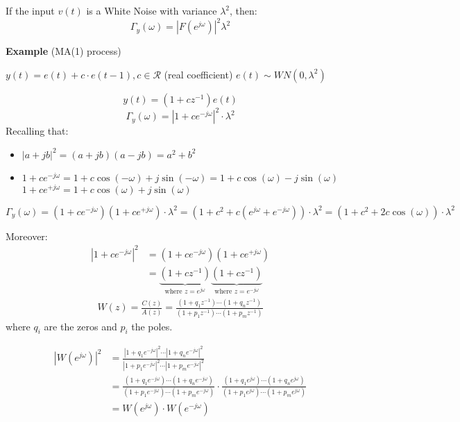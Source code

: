 If the input $v(t)$ is a White Noise with variance $\lambda^{2}$, then:
$$
\Gamma_{y}(\omega)=\left|F\left(e^{j \omega}\right)\right|^{2} \lambda^{2}
$$

\textbf{Example} (MA(1) process)

$y(t)=e(t)+c \cdot e(t-1), c \in \mathcal{R}$ (real coefficient)
$e(t)\sim W N(0,\lambda^{2} )$

$$
y(t)=\left(1+c z^{-1}\right) e(t)
$$
$$
\Gamma_{y}(\omega)=\left|1+c e^{-j \omega}\right|^{2} \cdot \lambda^{2}
$$
Recalling that:
\begin{itemize}
	\item $|a+j b|^{2}=(a+j b)(a-j b)=a^{2}+b^{2}$
	\item $1+c e^{-j \omega}=1+c \cos (-\omega)+j \sin (-\omega)=1+c \cos (\omega)-j \sin (\omega)$ $1+c e^{+j \omega}=1+c \cos (\omega)+j \sin (\omega)$
\end{itemize}

$$
\Gamma_{y}(\omega)=\left(1+c e^{-j \omega}\right)\left(1+c e^{+j \omega}\right)\cdot \lambda^{2}=(1+c^{2}+c\left(e^{j \omega}+e^{-j \omega}\right))\cdot \lambda^{2}=(1+c^{2}+2 c \cos (\omega))\cdot \lambda^{2}
$$


Moreover:
\begin{align*}
	|1+c e^{-j \omega}|^2&=\left(1+c e^{-j \omega}\right)\left(1+c e^{+j \omega}\right)\\
	&=\underbrace{\left(1+c z^{-1}\right)}_\text{where $z=e^{j \omega}$}\underbrace{\left(1+c z^{-1}\right)}_\text{where $z=e^{-j \omega}$}
\end{align*}
\begin{align*}
	W(z)=\frac{C(z)}{A(z)}=\frac{(1+q_1z^{-1})\cdots(1+q_nz^{-1})}{(1+p_1z^{-1})\cdots(1+p_mz^{-1})}
\end{align*}
where $q_i$ are the zeros and $p_i$ the poles.

\begin{align*}
	\left|W\left(e^{j \omega}\right)\right|^{2}&=\frac{|1+q_1e^{-j \omega}|^2\cdots|1+q_ne^{-j \omega}|^2}{|1+p_1e^{-j \omega}|^2\cdots|1+p_me^{-j \omega}|^2}\\
	&=\frac{(1+q_1e^{-j \omega})\cdots(1+q_ne^{-j \omega})}{(1+p_1e^{-j \omega})\cdots(1+p_me^{-j \omega})}\cdot\frac{(1+q_1e^{j \omega})\cdots(1+q_ne^{j \omega})}{(1+p_1e^{j \omega})\cdots(1+p_me^{j \omega})}\\
			&=W\left(e^{j \omega}\right)\cdot W\left(e^{-j \omega}\right)
\end{align*}
